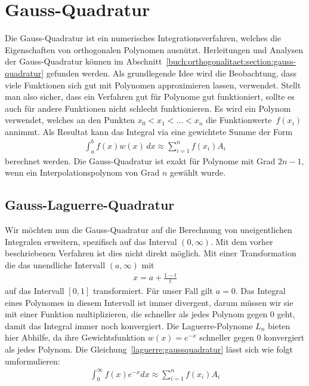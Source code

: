 %
%
%
\section{Gauss-Quadratur
  \label{laguerre:section:quadratur}}
Die Gauss-Quadratur ist ein numerisches Integrationsverfahren,
welches die Eigenschaften von orthogonalen Polynomen ausnützt.
Herleitungen und Analysen der Gauss-Quadratur können im 
Abschnitt~\ref{buch:orthogonalitaet:section:gauss-quadratur} gefunden werden.
Als grundlegende Idee wird die Beobachtung,
dass viele Funktionen sich gut mit Polynomen approximieren lassen,
verwendet.
Stellt man also sicher,
dass ein Verfahren gut für Polynome gut funktioniert, 
sollte es auch für andere Funktionen nicht schlecht funktionieren.
Es wird ein Polynom verwendet, 
welches an den Punkten $x_0 < x_1 < \ldots < x_n$ 
die Funktionwerte~$f(x_i)$ annimmt.
Als Resultat kann das Integral via eine gewichtete Summe der Form
\begin{align}
\int_a^b f(x) w(x) \, dx
\approx
\sum_{i=1}^n f(x_i) A_i
\label{laguerre:gaussquadratur}
\end{align}
berechnet werden.
Die Gauss-Quadratur ist exakt für Polynome mit Grad $2n -1$,
wenn ein Interpolationspolynom von Grad $n$ gewählt wurde.

\subsection{Gauss-Laguerre-Quadratur
\label{laguerre:subsection:gausslag-quadratur}}
Wir möchten nun die Gauss-Quadratur auf die Berechnung
von uneigentlichen Integralen erweitern,
spezifisch auf das Interval $(0, \infty)$.
Mit dem vorher beschriebenen Verfahren ist dies nicht direkt möglich.
Mit einer Transformation die das unendliche Intervall $(a, \infty)$ mit
\begin{align*}
x
=
a + \frac{1 - t}{t}
\end{align*}
auf das Intervall $[0, 1]$ transformiert.
Für unser Fall gilt $a = 0$.
Das Integral eines Polynomes in diesem Intervall ist immer divergent,
darum müssen wir sie mit einer Funktion multiplizieren,
die schneller als jedes Polynom gegen $0$ geht,
damit das Integral immer noch konvergiert.
Die Laguerre-Polynome $L_n$ bieten hier Abhilfe,
da ihre Gewichtsfunktion $w(x) = e^{-x}$ schneller
gegen $0$ konvergiert als jedes Polynom.
Die Gleichung~\eqref{laguerre:gaussquadratur} lässt sich wie folgt
umformulieren:
\begin{align}
\int_{0}^{\infty} f(x) e^{-x} dx
\approx
\sum_{i=1}^{n} f(x_i) A_i
\label{laguerre:laguerrequadratur}
\end{align}


